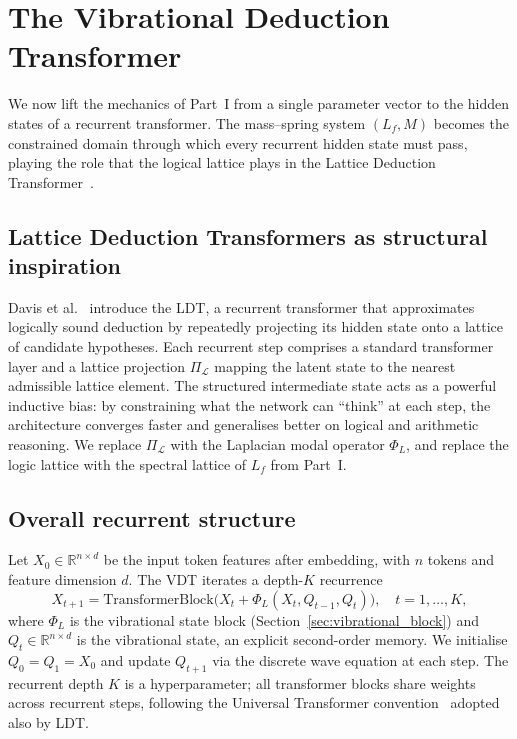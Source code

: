 \documentclass[12pt,a4paper]{article}
\theoremstyle{plain}
\theoremstyle{definition}
\theoremstyle{remark}
\newcommand{\R}{\mathbb{R}}
\newcommand{\1}{\mathbf{1}}
\newcommand{\VDT}{\textsc{VDT}}
\begin{document}
\section{The Vibrational Deduction Transformer}
\label{sec:architecture}

We now lift the mechanics of Part~I from a single parameter vector to the
hidden states of a recurrent transformer. The mass--spring system
$(L_f,M)$ becomes the constrained domain through which every recurrent
hidden state must pass, playing the role that the logical lattice plays
in the Lattice Deduction Transformer~\cite{davis2026ldt}.

\subsection{Lattice Deduction Transformers as structural inspiration}

Davis et al.~\cite{davis2026ldt} introduce the \textsc{LDT}, a recurrent
transformer that approximates logically sound deduction by repeatedly
projecting its hidden state onto a lattice of candidate hypotheses. Each
recurrent step comprises a standard transformer layer and a lattice
projection $\Pi_\mathcal{L}$ mapping the latent state to the nearest
admissible lattice element. The structured intermediate state acts as a
powerful inductive bias: by constraining what the network can ``think''
at each step, the architecture converges faster and generalises better
on logical and arithmetic reasoning. We replace $\Pi_\mathcal{L}$ with
the Laplacian modal operator $\Phi_L$, and replace the logic lattice with
the spectral lattice of $L_f$ from Part~I.

\subsection{Overall recurrent structure}

Let $X_0 \in \R^{n \times d}$ be the input token features after
embedding, with $n$ tokens and feature dimension $d$. The \VDT{} iterates
a depth-$K$ recurrence
\begin{equation}
  X_{t+1} = \mathrm{TransformerBlock}\!\bigl(
    X_t + \Phi_L(X_t, Q_{t-1}, Q_t)
  \bigr),
  \quad t = 1,\dots,K,
  \label{eq:vdt_recurrence}
\end{equation}
where $\Phi_L$ is the vibrational state block
(Section~\ref{sec:vibrational_block}) and $Q_t \in \R^{n \times d}$ is
the vibrational state, an explicit second-order memory. We initialise
$Q_0 = Q_1 = X_0$ and update $Q_{t+1}$ via the discrete wave equation at
each step. The recurrent depth $K$ is a hyperparameter; all transformer
blocks share weights across recurrent steps, following the Universal
Transformer convention~\cite{dehghani2019universal} adopted also by
\textsc{LDT}.
\end{document}
